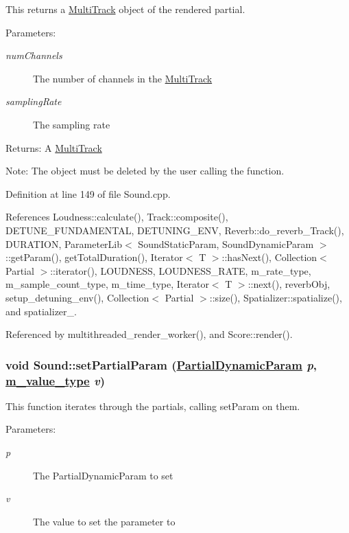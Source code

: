 This returns a \hyperlink{classMultiTrack}{Multi\-Track} object of the rendered partial. \begin{Desc}
\item[Parameters:]
\begin{description}
\item[{\em num\-Channels}]The number of channels in the \hyperlink{classMultiTrack}{Multi\-Track} \item[{\em sampling\-Rate}]The sampling rate \end{description}
\end{Desc}
\begin{Desc}
\item[Returns:]A \hyperlink{classMultiTrack}{Multi\-Track} \end{Desc}
\begin{Desc}
\item[Note:]The object must be deleted by the user calling the function. \end{Desc}


Definition at line 149 of file Sound.cpp.

References Loudness::calculate(), Track::composite(), DETUNE\_\-FUNDAMENTAL, DETUNING\_\-ENV, Reverb::do\_\-reverb\_\-Track(), DURATION, Parameter\-Lib$<$ Sound\-Static\-Param, Sound\-Dynamic\-Param $>$::get\-Param(), get\-Total\-Duration(), Iterator$<$ T $>$::has\-Next(), Collection$<$ Partial $>$::iterator(), LOUDNESS, LOUDNESS\_\-RATE, m\_\-rate\_\-type, m\_\-sample\_\-count\_\-type, m\_\-time\_\-type, Iterator$<$ T $>$::next(), reverb\-Obj, setup\_\-detuning\_\-env(), Collection$<$ Partial $>$::size(), Spatializer::spatialize(), and spatializer\_\-.

Referenced by multithreaded\_\-render\_\-worker(), and Score::render().\hypertarget{classSound_a4}{
\subsubsection[setPartialParam]{\setlength{\rightskip}{0pt plus 5cm}void Sound::set\-Partial\-Param (\hyperlink{Partial_8h_a20}{Partial\-Dynamic\-Param} {\em p}, \hyperlink{Types_8h_a3}{m\_\-value\_\-type} {\em v})}}
\label{classSound_a4}


This function iterates through the partials, calling set\-Param on them. \begin{Desc}
\item[Parameters:]
\begin{description}
\item[{\em p}]The Partial\-Dynamic\-Param to set \item[{\em v}]The value to set the parameter to \end{description}
\end{Desc}


